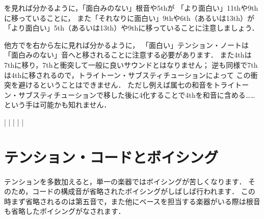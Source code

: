\documentclass[dvipdfmx,uplatex,b5paper,openany,jbase=12Q,nomag*,textwidth-limit=44%
               ]{gachimuchi}
\begin{document}
を見れば分かるように，「面白みのない」根音や5thが
「より面白い」\bSharp11thや\bFlat9thに移っていることに，
また「それなりに面白い」\bNatural9thや\bNatural6th（あるいは\bNatural13th）が
「より面白い」\bSharp5th（あるいは\bFlat13th）や\bSharp9thに移っていることに注意しましょう．

他方でを右から左に見れば分かるように，
「面白い」テンション・ノートは「面白みのない」音へと移されることに注意する必要があります．
また4thは\bNatural7thに移り，\bFlat7thと衝突して一般に良いサウンドとはなりません；
逆も同様で\bNatural7thは4thに移されるので，トライトーン・サブスティチューションによって
この衝突を避けるということはできません．
ただし例えば属七の和音をトライトーン・サブスティチューションで移した後に\Sus4化することで4thを和音に含める……
という手は可能かも知れません．
\begin{Music}
  \Startpiece
  \Notes%
  |%
  \en\bar
  \Notes%
  |%
  \en\bar
  \Notes%
  |%
  \en
  \endpiece
\end{Music}



\section{テンション・コードとボイシング}
テンションを多数加えると，単一の楽器ではボイシングが苦しくなります．
そのため，コードの構成音が省略されたボイシングがしばしば行われます．
この時まず省略されるのは第五音で，また他にベースを担当する楽器がいる際は根音も省略したボイシングがなされます．
\end{document}

